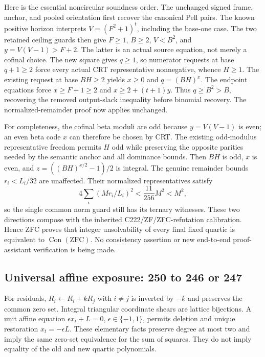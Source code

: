 Here is the essential noncircular soundness order.  The unchanged signed
frame, anchor, and pooled orientation first recover the canonical Pell
pairs.  The known positive horizon interprets
$V=(F^2+1)^t$, including the base-one case.  The two retained ceiling guards
then give $F\ge1$, $B\ge2$, $V<B^2$, and
$y=V(V-1)>F+2$.  The latter is an actual source equation, not merely a
cofinal choice.  The new square gives $q\ge1$, so numerator requests at
base $q+1\ge2$ force every actual CRT representative nonnegative, whence
$H\ge1$.  The existing request at base $BH\ge2$ yields
$x\ge0$ and $q=(BH)^x$.  The endpoint equations force
$x\ge F+1\ge2$ and $x\ge2+(t+1)y$.  Thus $q\ge B^2>B$,
recovering the removed output-slack inequality before binomial recovery.
The normalized-remainder proof now applies unchanged.

For completeness, the cofinal beta moduli are odd because $y=V(V-1)$ is
even; an even beta code $x$ can therefore be chosen by CRT.  The existing
odd-modulus representative freedom permits $H$ odd while preserving the
opposite parities needed by the semantic anchor and all dominance bounds.
Then $BH$ is odd, $x$ is even, and
$z=((BH)^{x/2}-1)/2$ is integral.  The genuine remainder bounds
$r_i<L_i/32$ are unaffected.  Their normalized representatives satisfy
\[
 4\sum_i (M r_i/L_i)^2<\frac{11}{256}M^2<M^2,
\]
so the single common norm guard still has its ternary witnesses.
These two directions compose with the inherited C222/ZF/ZFC-refutation
calibration.  Hence ZFC proves that integer unsolvability of every final
fixed quartic is equivalent to $\operatorname{Con}(\mathrm{ZFC})$.
No consistency assertion or new end-to-end proof-assistant verification is
being made.

\subsection{Universal affine exposure: 250 to 246 or 247}
For residuals, $R_i\leftarrow R_i+kR_j$ with $i\ne j$ is inverted by
$-k$ and preserves the common zero set.  Integral triangular coordinate
shears are lattice bijections.  A unit affine equation
$\epsilon x_t+L=0$, $\epsilon\in\{-1,1\}$, permits deletion and unique
restoration $x_t=-\epsilon L$.  These elementary facts preserve degree at
most two and imply the same zero-set equivalence for the sum of squares.
They do not imply equality of the old and new quartic polynomials.

